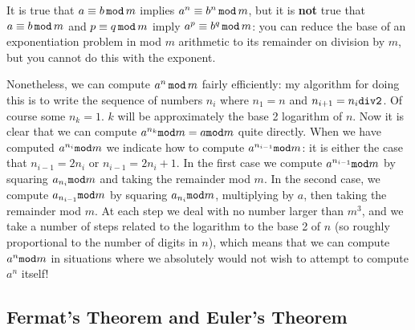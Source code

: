 \documentclass[12pt]{article}
\begin{document}
It is true that $a \equiv b\,{\tt mod}\,m$ implies $a^n\equiv b^n\,{\tt mod}\,m$, but it is {\bf not} true that $a\equiv b\,{\tt mod}\,m$ and $p \equiv q\,{\tt mod} \,m$ imply $a^p \equiv b^q\,{\tt mod}\,m$:  you can reduce the base
of an exponentiation problem in mod $m$ arithmetic to its remainder on division by $m$, but you cannot do this with the exponent.

Nonetheless, we can compute $a^n\,{\tt mod}\,m$ fairly efficiently:   my algorithm for doing this is to write the sequence of numbers $n_i$ where $n_1=n$ and $n_{i+1}=n_i{\tt div 2}$.   Of course some $n_k=1$.   $k$ will be approximately the base 2 logarithm of $n$.   Now it is clear that we can compute $a^{n_k}{\tt mod}m=a{\tt mod}m$ quite directly.   When we have computed $a^{n_i}{\tt mod}m$ we indicate how to compute $a^{n_{i-1}}{\tt mod}m$:   it is either the case that $n_{i-1}=2n_i$ or $n_{i-1}=2n_i+1$.
In the first case we compute $a^{n_{i-1}}{\tt mod}m$ by squaring $a_{n_i}{\tt mod}m$ and taking the remainder mod $m$.   In the second case, we compute $a_{n_{i-1}}{\tt mod}m$ by squaring $a_{n_i}{\tt mod}m$, multiplying by $a$, then taking the remainder mod $m$.  At each step we deal with no number larger than $m^3$, and we take a number of steps related to the logarithm to the base 2 of $n$ (so roughly proportional to the number of digits in $n$), which means that we can compute $a^n{\tt mod}m$ in situations where
we absolutely would not wish to attempt to compute $a^n$ itself!

\subsection{Fermat's Theorem and Euler's Theorem}
\end{document}
